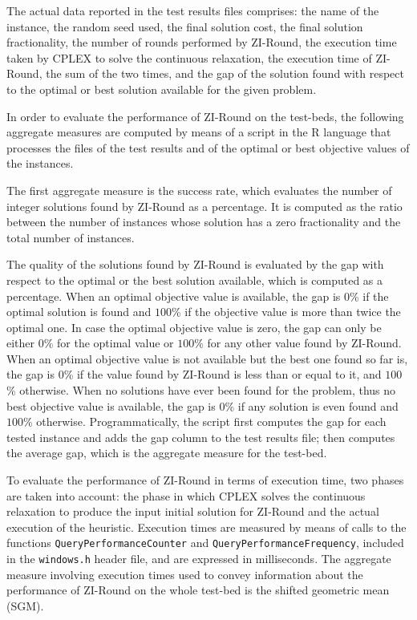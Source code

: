 \documentclass[a4paper,12pt]{book}
\begin{document}
The actual data reported in the test results files comprises: the name of the instance, the random seed used, the final solution cost, the final solution fractionality, the number of rounds performed by ZI-Round, the execution time taken by CPLEX to solve the continuous relaxation, the execution time of ZI-Round, the sum of the two times, and the gap of the solution found with respect to the optimal or best solution available for the given problem. \par 

In order to evaluate the performance of ZI-Round on the test-beds, the following aggregate measures are computed by means of a script in the R language that processes the files of the test results and of the optimal or best objective values of the instances. \par
The first aggregate measure is the success rate, which evaluates the number of integer solutions found by ZI-Round as a percentage. It is computed as the ratio between the number of instances whose solution has a zero fractionality and the total number of instances. \par
The quality of the solutions found by ZI-Round is evaluated by the gap with respect to the optimal or the best solution available, which is computed as a percentage. When an optimal objective value is available, the gap is $0$\% if the optimal solution is found and $100$\% if the objective value is more than twice the optimal one. In case the optimal objective value is zero, the gap can only be either $0$\% for the optimal value or $100$\% for any other value found by ZI-Round. When an optimal objective value is not available but the best one found so far is, the gap is $0$\% if the value found by ZI-Round is less than or equal to it, and $100$\% otherwise. When no solutions have ever been found for the problem, thus no best objective value is available, the gap is $0$\% if any solution is even found and $100$\% otherwise. Programmatically, the script first computes the gap for each tested instance and adds the gap column to the test results file; then computes the average gap, which is the aggregate measure for the test-bed. \par
To evaluate the performance of ZI-Round in terms of execution time, two phases are taken into account: the phase in which CPLEX solves the continuous relaxation to produce the input initial solution for ZI-Round and the actual execution of the heuristic. Execution times are measured by means of calls to the functions \texttt{QueryPerformanceCounter} and \texttt{QueryPerformanceFrequency}, included in the \texttt{windows.h} header file, and are expressed in milliseconds. The aggregate measure involving execution times used to convey information about the performance of ZI-Round on the whole test-bed is the shifted geometric mean (SGM). 
\end{document}
